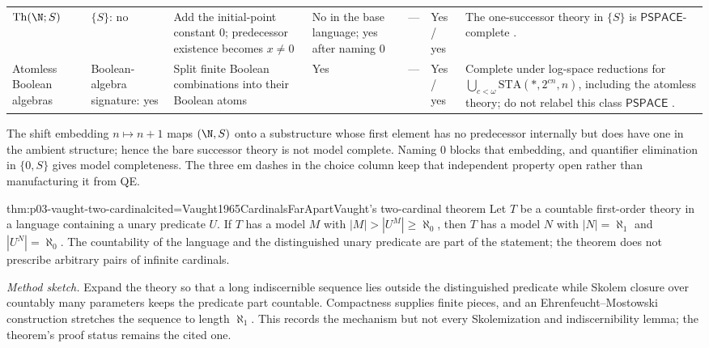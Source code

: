 \begin{landscape}
\begin{longtable}{@{}p{.65in}p{1.10in}p{1.20in}p{.60in}p{.70in}p{.80in}p{2.10in}@{}}
\addlinespace
\(\operatorname{Th}(\N;S)\) & \(\{S\}\): no & Add the initial-point constant \(0\); predecessor existence becomes \(x\ne0\) & No in the base language; yes after naming \(0\) & --- & Yes / yes & The one-successor theory in \(\{S\}\) is \(\mathsf{PSPACE}\)-complete \cite{FerranteRackoff1979}. \\
\addlinespace
Atomless Boolean algebras & Boolean-algebra signature: yes & Split finite Boolean combinations into their Boolean atoms & Yes & --- & Yes / yes & Complete under log-space reductions for \(\bigcup_{c<\omega}\mathrm{STA}(*,2^{cn},n)\), including the atomless theory; do not relabel this class \(\mathsf{PSPACE}\) \cite{Kozen1980}. \\
\bottomrule
\end{longtable}
\endgroup
\end{landscape}

The shift embedding \(n\mapsto n+1\) maps \((\N,S)\) onto a substructure
whose first element has no predecessor internally but does have one in the
ambient structure; hence the bare successor theory is not model complete.
Naming \(0\) blocks that embedding, and quantifier elimination in
\(\{0,S\}\) gives model completeness.  The three em dashes in the choice
column keep that independent property open rather than manufacturing it from
QE.


\begin{hbtheorem}{thm:p03-vaught-two-cardinal}{cited=Vaught1965CardinalsFarApart}{Vaught's two-cardinal theorem}
Let \(T\) be a countable first-order theory in a language containing a unary
predicate \(U\). If \(T\) has a model \(M\) with
\(|M|>|U^M|\ge\aleph_0\), then \(T\) has a model \(N\) with
\(|N|=\aleph_1\) and \(|U^N|=\aleph_0\). The countability of the language and
the distinguished unary predicate are part of the statement; the theorem does
not prescribe arbitrary pairs of infinite cardinals.
\end{hbtheorem}

\noindent\emph{Method sketch.}
Expand the theory so that a long indiscernible sequence lies outside the
distinguished predicate while Skolem closure over countably many parameters
keeps the predicate part countable. Compactness supplies finite pieces, and an
Ehrenfeucht--Mostowski construction stretches the sequence to length
\(\aleph_1\). This records the mechanism but not every Skolemization and
indiscernibility lemma; the theorem's proof status remains the cited one.

